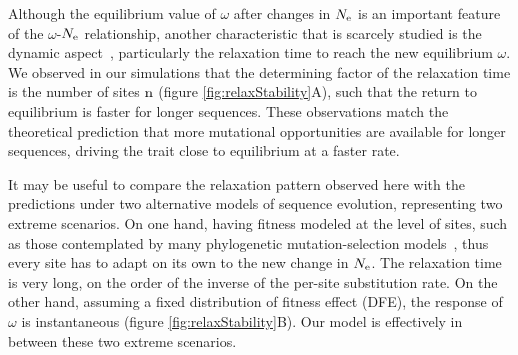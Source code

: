 Although the equilibrium value of $\omega$ after changes in $N_{\mathrm{e}}$ is an important feature of the $\omega$-$N_{\mathrm{e}}$ relationship, another characteristic that is scarcely studied is the dynamic aspect~\citep{Jones2016}, particularly the relaxation time to reach the new equilibrium $\omega$.
We observed in our simulations that the determining factor of the relaxation time is the number of sites $\text{n}$ (figure \ref{fig:relaxStability}A), such that the return to equilibrium is faster for longer sequences.
These observations match the theoretical prediction that more mutational opportunities are available for longer sequences, driving the trait close to equilibrium at a faster rate.

It may be useful to compare the relaxation pattern observed here with the predictions under two alternative models of sequence evolution, representing two extreme scenarios.
On one hand, having fitness modeled at the level of sites, such as those contemplated by many phylogenetic mutation-selection models~\citep{Halpern1998, Rodrigue2010, Tamuri2012}, thus every site has to adapt on its own to the new change in $N_{\mathrm{e}}$.
The relaxation time is very long, on the order of the inverse of the per-site \gls{substitution} rate.
On the other hand, assuming a fixed distribution of fitness effect (\acrshort{DFE}), the response of $\omega$ is instantaneous (figure \ref{fig:relaxStability}B).
Our model is effectively in between these two extreme scenarios.

